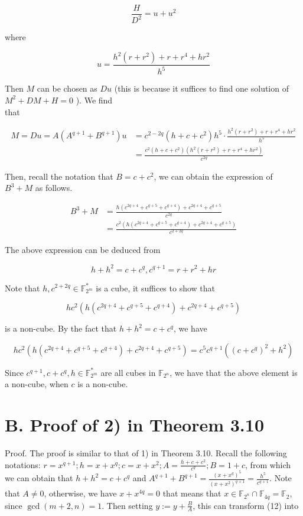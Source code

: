 \documentclass[10pt]{article}
\begin{document}
\begin{equation*}
\frac{H}{D^{2}}=u+u^{2} \tag{21}
\end{equation*}


where

$$
u=\frac{h^{2}\left(r+r^{2}\right)+r+r^{4}+h r^{2}}{h^{5}}
$$

Then $M$ can be chosen as $D u$ (this is because it suffices to find one solution of $M^{2}+D M+H=0$ ). We find\\
that

$$
\begin{aligned}
M=D u=A\left(A^{q+1}+B^{q+1}\right) u & =c^{2-2 q}\left(h+c+c^{2}\right) h^{5} \cdot \frac{h^{2}\left(r+r^{2}\right)+r+r^{4}+h r^{2}}{h^{5}} \\
& =\frac{c^{2}\left(h+c+c^{2}\right)\left(h^{2}\left(r+r^{2}\right)+r+r^{4}+h r^{2}\right)}{c^{2 q}}
\end{aligned}
$$

Then, recall the notation that $B=c+c^{2}$, we can obtain the expression of $B^{3}+M$ as follows.


\begin{align*}
B^{3}+M & =\frac{h\left(c^{2 q+4}+c^{q+5}+c^{q+4}\right)+c^{2 q+4}+c^{q+5}}{c^{2 q}} \\
& =\frac{c^{2}\left(h\left(c^{2 q+4}+c^{q+5}+c^{q+4}\right)+c^{2 q+4}+c^{q+5}\right)}{c^{2+2 q}} \tag{22}
\end{align*}


The above expression can be deduced from

$$
h+h^{2}=c+c^{q}, c^{q+1}=r+r^{2}+h r
$$

Note that $h, c^{2+2 q} \in \mathbb{F}_{2^{m}}^{*}$ is a cube, it suffices to show that

$$
h c^{2}\left(h\left(c^{2 q+4}+c^{q+5}+c^{q+4}\right)+c^{2 q+4}+c^{q+5}\right)
$$

is a non-cube. By the fact that $h+h^{2}=c+c^{q}$, we have

$$
h c^{2}\left(h\left(c^{2 q+4}+c^{q+5}+c^{q+4}\right)+c^{2 q+4}+c^{q+5}\right)=c^{5} c^{q+1}\left(\left(c+c^{q}\right)^{2}+h^{2}\right)
$$

Since $c^{q+1}, c+c^{q}, h \in \mathbb{F}_{2^{m}}^{*}$ are all cubes in $\mathbb{F}_{2^{n}}$, we have that the above element is a non-cube, when $c$ is a non-cube.

\section*{B. Proof of 2) in Theorem 3.10}
Proof. The proof is similar to that of 1) in Theorem 3.10. Recall the following notations: $r=x^{q+1} ; h= x+x^{q} ; c=x+x^{2} ; A=\frac{h+c+c^{2}}{c^{q}} ; B=1+c$, from which we can obtain that $h+h^{2}=c+c^{q}$ and $A^{q+1}+B^{q+1}= \frac{\left(x+x^{q}\right)^{5}}{\left(x+x^{2}\right)^{q+1}}=\frac{h^{5}}{c^{q+1}}$. Note that $A \neq 0$, otherwise, we have $x+x^{4 q}=0$ that means that $x \in \mathbb{F}_{2^{n}} \cap \mathbb{F}_{4 q}=\mathbb{F}_{2}$, since $\operatorname{gcd}(m+2, n)=1$. Then setting $y:=y+\frac{B}{A}$, this can transform (12) into
\end{document}
